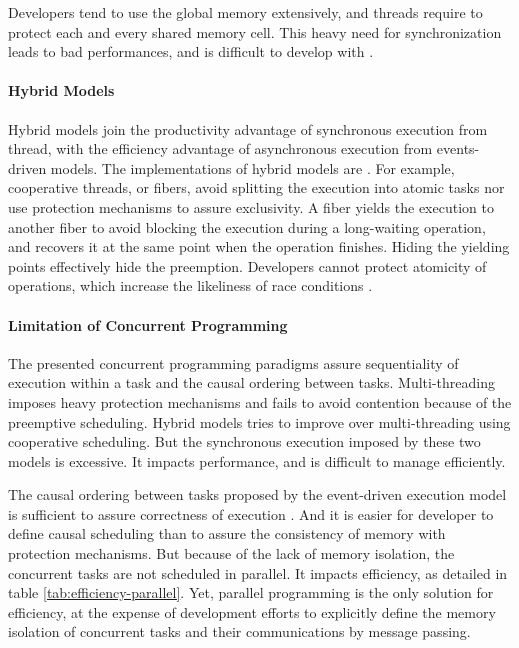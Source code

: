 Developers tend to use the global memory extensively, and threads require to protect each and every shared memory cell.
This heavy need for synchronization leads to bad performances, and is difficult to develop with \cite{Adya2002}.

\paragraph{Hybrid Models}

Hybrid models join the productivity advantage of synchronous execution from thread, with the efficiency advantage of asynchronous execution from events-driven models.
The implementations of hybrid models are .
For example, cooperative threads, or fibers, avoid splitting the execution into atomic tasks nor use protection mechanisms to assure exclusivity.
A fiber yields the execution to another fiber to avoid blocking the execution during a long-waiting operation, and recovers it at the same point when the operation finishes.
Hiding the yielding points effectively hide the preemption.
Developers cannot protect atomicity of operations, which increase the likeliness of race conditions .

\paragraph{Limitation of Concurrent Programming}

The presented concurrent programming paradigms assure sequentiality of execution within a task and the causal ordering between tasks.
Multi-threading imposes heavy protection mechanisms and fails to avoid contention because of the preemptive scheduling.
Hybrid models tries to improve over multi-threading using cooperative scheduling.
But the synchronous execution imposed by these two models is excessive.
It impacts performance, and is difficult to manage efficiently.

The causal ordering between tasks proposed by the event-driven execution model is sufficient to assure correctness of execution \cite{Lamport1978,Reed2012}.
And it is easier for developer to define causal scheduling than to assure the consistency of memory with protection mechanisms.
But because of the lack of memory isolation, the concurrent tasks are not scheduled in parallel.
It impacts efficiency, as detailed in table \ref{tab:efficiency-parallel}.
Yet, parallel programming is the only solution for efficiency, at the expense of development efforts to explicitly define the memory isolation of concurrent tasks and their communications by message passing.

